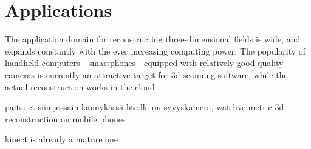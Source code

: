 \section{Applications}

The application domain for reconstructing three-dimensional fields is wide, and expands constantly with the ever increasing computing power. The popularity of handheld computers - smartphones - equipped with relatively good quality cameras is currently an attractive target for 3d scanning software, while the actual reconstruction works in the cloud

paitsi et siin jossain kännykässä htc:llä on syvyskamera, wat
live metric 3d reconstruction on mobile phones

kinect is already a mature one
